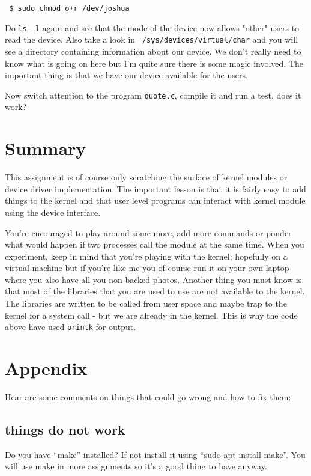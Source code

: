\documentclass[a4paper,11pt]{article}
\begin{document}
\begin{verbatim}
 $ sudo chmod o+r /dev/joshua
\end{verbatim}

Do {\tt ls -l} again and see that the mode of the device now allows
"other" users to read the device. Also take a look in {\tt
  /sys/devices/virtual/char} and you will see a directory containing
information about our device. We don't really need to know what is
going on here but I'm quite sure there is some magic involved. The
important thing is that we have our device available for the users.

Now switch attention to the program {\tt quote.c}, compile it and run
a test, does it work?

\section{Summary}

This assignment is of course only scratching the surface of kernel
modules or device driver implementation. The important lesson is that
it is fairly easy to add things to the kernel and that user level
programs can interact with kernel module using the device interface.

You're encouraged to play around some more, add more commands or ponder
what would happen if two processes call the module at the same
time. When you experiment, keep in mind that you're playing with the
kernel; hopefully on a virtual machine but if you're like me you of
course run it on your own laptop where you also have all you
non-backed photos. Another thing you must know is that most of the
libraries that you are used to use are not available to the
kernel. The libraries are written to be called from user space and
maybe trap to the kernel for a system call - but we are already in the
kernel. This is why the code above have used {\tt printk} for output.

\section*{Appendix}

Hear are some comments on things that could go wrong and how to fix them:

\subsection*{things do not work}

Do you have ``make'' installed? If not install it using ``sudo apt
install make''. You will use make in more assignments so it's a good
thing to have anyway.
\end{document}
